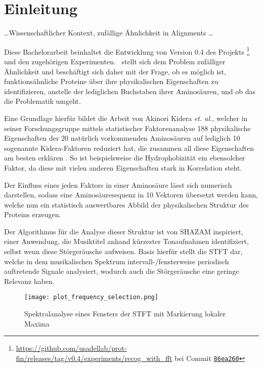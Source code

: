 \section{Einleitung} %
    \label{sec:einleitung}
    \dots Wissenschaftlicher Kontext, zufällige Ähnlichkeit in Alignments \dots

    Diese Bachelorarbeit beinhaltet die Entwicklung von Version 0.4 des Projekts \protfin\footnote{\url{https://github.com/usadellab/prot-fin/releases/tag/v0.4/experiments/recog_with_fft} bei Commit \href{https://github.com/usadellab/prot-fin/tree/86ea260b7c6d7bb520b57e2b29e350bd3942fe71/experiments/recog_with_fft}{\texttt{86ea260}}} und den zugehörigen Experimenten. \protfin\ stellt sich dem Problem zufälliger Ähnlichkeit und beschäftigt sich daher mit der Frage, ob es möglich ist, funktionsähnliche Proteine über ihre physikalischen Eigenschaften zu identifizieren, anstelle der lediglichen Buchstaben ihrer Aminosäuren, und ob das die Problematik umgeht.

    Eine Grundlage hierfür bildet die Arbeit von Akinori Kidera \textit{et. al.}, welcher in seiner Forschungsgruppe mittels statistischer Faktorenanalyse 188 physikalische Eigenschaften der 20 natürlich vorkommenden Aminosäuren auf lediglich 10 sogenannte Kidera-Faktoren reduziert hat, die zusammen all diese Eigenschaften am besten erklären . So ist beispielsweise die Hydrophobizität ein ebensolcher Faktor, da diese mit vielen anderen Eigenschaften stark in Korrelation steht.

    Der Einfluss eines jeden Faktors in einer Aminosäure lässt sich numerisch darstellen, sodass eine Aminosäuresequenz in 10 Vektoren übersetzt werden kann, welche nun ein statistisch auswertbares Abbild der physikalischen Struktur des Proteins erzeugen.

    Der Algorithmus für die Analyse dieser Struktur ist von SHAZAM inspiriert, einer Anwendung, die Musiktitel anhand kürzester Tonaufnahmen identifiziert, selbst wenn diese Störgeräusche aufweisen. Basis hierfür stellt die \ac{STFT} dar, welche in dem musikalischen Spektrum intervall-/fensterweise periodisch auftretende Signale analysiert, wodurch auch die Störgeräusche eine geringe Relevanz haben.

    \begin{wrapfigure}{r}{0.5\textwidth}
        \texttt{[image: plot\_frequency\_selection.png]}
        \caption{Spektralanalyse eines Fensters der STFT mit Markierung lokaler Maxima}
        \label{fig:freq_selection}
    \end{wrapfigure}

